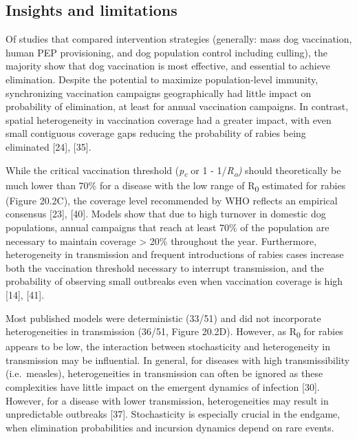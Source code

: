 \documentclass[
]{book}
\begin{document}
\hypertarget{insights-and-limitations}{%
\subsection{Insights and limitations}\label{insights-and-limitations}}

Of studies that compared intervention strategies (generally: mass dog
vaccination, human PEP provisioning, and dog population control
including culling), the majority show that dog vaccination is most
effective, and essential to achieve elimination. Despite the potential
to maximize population-level immunity, synchronizing vaccination
campaigns geographically had little impact on probability of
elimination, at least for annual vaccination campaigns. In contrast,
spatial heterogeneity in vaccination coverage had a greater impact, with
even small contiguous coverage gaps reducing the probability of rabies
being eliminated {[}24{]}, {[}35{]}.

While the critical vaccination threshold (\emph{p\textsubscript{c}} or 1 - 1/\emph{R\textsubscript{o})} should
theoretically be much lower than 70\% for a disease with the low range of
R\textsubscript{0} estimated for rabies (Figure 20.2C), the coverage level recommended
by WHO reflects an empirical consensus {[}23{]}, {[}40{]}. Models show that
due to high turnover in domestic dog populations, annual campaigns that
reach at least 70\% of the population are necessary to maintain coverage
\textgreater{} 20\% throughout the year. Furthermore, heterogeneity in transmission
and frequent introductions of rabies cases increase both the vaccination
threshold necessary to interrupt transmission, and the probability of
observing small outbreaks even when vaccination coverage is high {[}14{]},
{[}41{]}.

Most published models were deterministic (33/51) and did not incorporate
heterogeneities in transmission (36/51, Figure 20.2D). However, as R\textsubscript{0}
for rabies appears to be low, the interaction between stochasticity and
heterogeneity in transmission may be influential. In general, for
diseases with high transmissibility (i.e.~measles), heterogeneities in
transmission can often be ignored as these complexities have little
impact on the emergent dynamics of infection {[}30{]}. However, for a
disease with lower transmission, heterogeneities may result in
unpredictable outbreaks {[}37{]}. Stochasticity is especially crucial in
the endgame, when elimination probabilities and incursion dynamics
depend on rare events.
\end{document}
